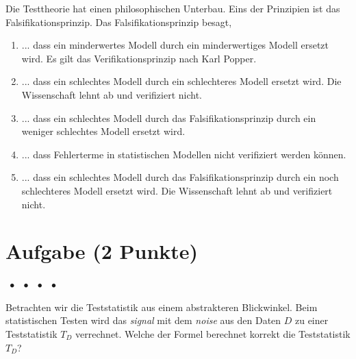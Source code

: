 \documentclass[a4paper, 9pt]{scrartcl}\usepackage[]{graphicx}\usepackage[]{xcolor}
\begin{document}
Die Testtheorie hat einen philosophischen Unterbau. Eins der Prinzipien ist das Falsifikationsprinzip. Das Falsifikationsprinzip besagt,



\begin{enumerate}
\item [\textbf{A} \msquare] ... dass ein minderwertes Modell durch ein minderwertiges Modell ersetzt wird. Es gilt das Verifikationsprinzip nach Karl Popper.
\item [\textbf{B} \msquare] ... dass ein schlechtes Modell durch ein schlechteres Modell ersetzt wird. Die Wissenschaft lehnt ab und verifiziert nicht.
\item [\textbf{C} \msquare] ... dass ein schlechtes Modell durch das Falsifikationsprinzip durch ein weniger schlechtes Modell ersetzt wird.
\item [\textbf{D} \msquare] ... dass Fehlerterme in statistischen Modellen nicht verifiziert werden können.
\item [\textbf{E} \msquare] ... dass ein schlechtes Modell durch das Falsifikationsprinzip durch ein noch schlechteres Modell ersetzt wird. Die Wissenschaft lehnt ab und verifiziert nicht.
\end{enumerate}

\section{Aufgabe \hfill (2 Punkte)}

\ifcollection
\begin{flushright}
\tiny\vspace{-2Ex}
\textbf{\examinhaltstart}
\exammodulemathstat $\;\bullet$
\exammodulestat $\;\bullet$
\exammodulestatbbv $\;\bullet$
\exammodulestatversuch $\;\bullet$
\exammodulebiostat
\vspace{-1Ex}
\end{flushright}
\fi




Betrachten wir die Teststatistik aus einem abstrakteren Blickwinkel. Beim statistischen Testen wird das \textit{signal} mit dem \textit{noise} aus den Daten $D$ zu einer Teststatistik $T_D$ verrechnet. Welche der Formel berechnet korrekt die Teststatistik $T_D$?
\end{document}
